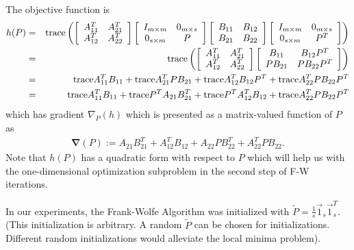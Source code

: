 \documentclass[12pt,oneside,final]{thesis}\usepackage[]{graphicx}\usepackage[]{color}
\begin{document}
The objective function is
\begin{eqnarray*}  h(P)  & =  &   \textup{trace} \left (
\left [  \begin{array}{cc}  A^T_{11} & A^T_{21} \\ A^T_{12} & A^T_{22}  \end{array} \right ]
\left [  \begin{array}{cc}  I_{m \times m} & 0_{m \times s}
\\ 0_{s \times m} & P  \end{array} \right ]
\left [  \begin{array}{cc}  B_{11} & B_{12} \\ B_{21} & B_{22}  \end{array} \right ]
\left [  \begin{array}{cc}  I_{m \times m} & 0_{m \times s}
\\ 0_{s \times m} & P^T  \end{array} \right ]
\right ) \\
& = & \textup{trace} \left (
\left [  \begin{array}{cc}  A^T_{11} & A^T_{21} \\ A^T_{12} & A^T_{22}  \end{array} \right ]
\left [  \begin{array}{cc}  B_{11} & B_{12}P^T \\ PB_{21} & PB_{22}P^T  \end{array} \right ]
\right )\\
& = & \textup{trace} A_{11}^TB_{11}+ \textup{trace} A_{21}^TPB_{21}+\textup{trace} A_{12}^TB_{12}P^T
+ \textup{trace} A_{22}^TPB_{22}P^T \\
& = &  \textup{trace} A_{11}^TB_{11}+ \textup{trace} P^T A_{21}B_{21}^T+\textup{trace} P^TA_{12}^TB_{12}
+ \textup{trace} A_{22}^TPB_{22}P^T
\end{eqnarray*}
which has gradient $\nabla_{P}(h)$ which is presented  as a matrix-valued function of $P$ as 
\begin{eqnarray*}
\boldsymbol{\nabla}(P):=A_{21}B_{21}^T+A_{12}^TB_{12}+A_{22}PB_{22}^T+A_{22}^TPB_{22} .
\end{eqnarray*} Note that $h(P)$ has a quadratic form with respect to $P$ which will help us with the one-dimensional optimization subproblem in the second step of F-W iterations.


In our experiments,  the Frank-Wolfe Algorithm was initialized with
$\tilde{P}=\frac{1}{s}\vec{1}_{s} \vec{1}_{s}^T$. (This initialization is arbitrary. A random $\tilde{P}$ can be chosen for initializations. Different random initializations would alleviate the local minima problem). 
\end{document}
